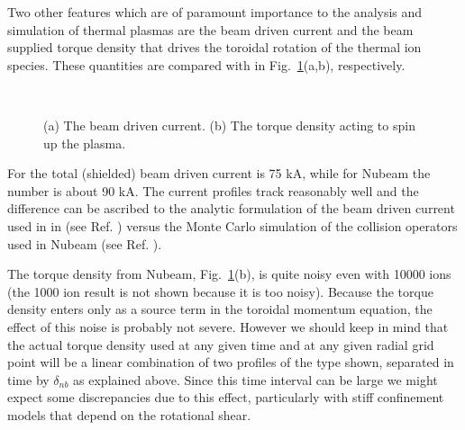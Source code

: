    Two other features which are of paramount importance to the
   analysis and simulation of thermal plasmas are the beam driven
   current and the beam supplied torque density that drives the
   toroidal rotation of the thermal ion species. These quantities are
   compared with \ot in Fig.~\ref{Fig4}(a,b), respectively. 
 \begin{figure} %
 \centering 
 \begin{narrow}{-.50in}{0in}   
   \mbox{
     }
   \mbox{  {}}
\end{narrow}
 \caption{(a) The beam driven current. (b) The torque density acting to
   spin up the plasma.}
  \label{Fig4}
 \end{figure}
   For \ot the
   total (shielded) beam driven current is 75 kA, while for Nubeam 
   the number is about 90 kA. The current profiles track reasonably
   well and the difference can be ascribed to the analytic formulation
   of the beam driven current used in in \ot (see Ref. \cite{ref2}) versus the Monte Carlo
   simulation of the collision operators used in Nubeam (see Ref. \cite{ref1}).

   The torque density from Nubeam, Fig.~\ref{Fig4}(b), is quite noisy
   even with 10000 ions (the 1000 ion result is not  shown because it is
   too noisy). Because the torque density enters only as a source term
   in the toroidal momentum equation, the effect of this noise is
   probably not severe. However we should keep in mind that the
   actual torque density used at any given time and at any given
   radial grid point will be a linear combination of two profiles of
   the  type shown, separated in time by $\delta_{nb}$ as explained
   above. Since this time interval can be large we might expect some
   discrepancies due to this effect, particularly with stiff
   confinement models that depend on the rotational shear.

